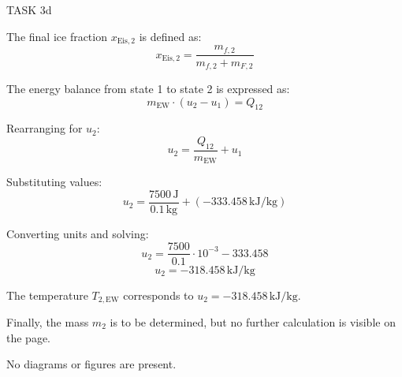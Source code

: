 TASK 3d

The final ice fraction \( x_{\text{Eis},2} \) is defined as:
\[
x_{\text{Eis},2} = \frac{m_{f,2}}{m_{f,2} + m_{F,2}}
\]

The energy balance from state 1 to state 2 is expressed as:
\[
m_{\text{EW}} \cdot (u_2 - u_1) = Q_{12}
\]

Rearranging for \( u_2 \):
\[
u_2 = \frac{Q_{12}}{m_{\text{EW}}} + u_1
\]

Substituting values:
\[
u_2 = \frac{7500 \, \text{J}}{0.1 \, \text{kg}} + (-333.458 \, \text{kJ/kg})
\]

Converting units and solving:
\[
u_2 = \frac{7500}{0.1} \cdot 10^{-3} - 333.458
\]
\[
u_2 = -318.458 \, \text{kJ/kg}
\]

The temperature \( T_{2,\text{EW}} \) corresponds to \( u_2 = -318.458 \, \text{kJ/kg} \).

Finally, the mass \( m_2 \) is to be determined, but no further calculation is visible on the page.

No diagrams or figures are present.